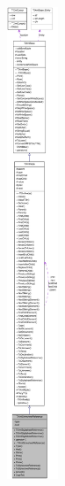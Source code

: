 \begin{figure}[H]
\begin{center}
\leavevmode
\includegraphics[height=400pt]{class_ti_xml_stylesheet_reference__coll__graph}
\end{center}
\end{figure}
